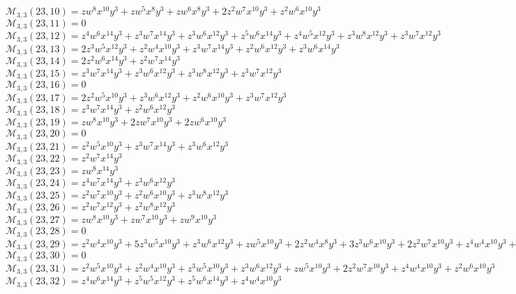 $\mathcal{M}_{3,3}(23,10)=zw^8x^{10}y^3+zw^5x^8y^3+zw^6x^8y^3+2z^2w^7x^{10}y^3+z^2w^6x^{10}y^3$\\
$\mathcal{M}_{3,3}(23,11)=0$\\
$\mathcal{M}_{3,3}(23,12)=z^4w^6x^{14}y^3+z^3w^7x^{14}y^3+z^3w^6x^{12}y^3+z^5w^6x^{14}y^3+z^4w^5x^{12}y^3+z^3w^8x^{12}y^3+z^3w^7x^{12}y^3$\\
$\mathcal{M}_{3,3}(23,13)=2z^3w^5x^{12}y^3+z^2w^4x^{10}y^3+z^3w^7x^{14}y^3+z^2w^6x^{12}y^3+z^3w^6x^{14}y^3$\\
$\mathcal{M}_{3,3}(23,14)=2z^2w^6x^{14}y^3+z^2w^7x^{14}y^3$\\
$\mathcal{M}_{3,3}(23,15)=z^3w^7x^{14}y^3+z^3w^6x^{12}y^3+z^3w^8x^{12}y^3+z^3w^7x^{12}y^3$\\
$\mathcal{M}_{3,3}(23,16)=0$\\
$\mathcal{M}_{3,3}(23,17)=2z^2w^5x^{10}y^3+z^3w^6x^{12}y^3+z^2w^6x^{10}y^3+z^3w^7x^{12}y^3$\\
$\mathcal{M}_{3,3}(23,18)=z^3w^7x^{14}y^3+z^2w^6x^{12}y^3$\\
$\mathcal{M}_{3,3}(23,19)=zw^8x^{10}y^3+2zw^7x^{10}y^3+2zw^6x^{10}y^3$\\
$\mathcal{M}_{3,3}(23,20)=0$\\
$\mathcal{M}_{3,3}(23,21)=z^2w^5x^{10}y^3+z^3w^7x^{14}y^3+z^3w^6x^{12}y^3$\\
$\mathcal{M}_{3,3}(23,22)=z^2w^7x^{14}y^3$\\
$\mathcal{M}_{3,3}(23,23)=zw^8x^{14}y^3$\\
$\mathcal{M}_{3,3}(23,24)=z^4w^7x^{14}y^3+z^3w^6x^{12}y^3$\\
$\mathcal{M}_{3,3}(23,25)=z^2w^7x^{10}y^3+z^2w^6x^{10}y^3+z^3w^8x^{12}y^3$\\
$\mathcal{M}_{3,3}(23,26)=z^2w^7x^{12}y^3+z^2w^8x^{12}y^3$\\
$\mathcal{M}_{3,3}(23,27)=zw^8x^{10}y^3+zw^7x^{10}y^3+zw^9x^{10}y^3$\\
$\mathcal{M}_{3,3}(23,28)=0$\\
$\mathcal{M}_{3,3}(23,29)=z^2w^4x^{10}y^3+5z^3w^5x^{10}y^3+z^3w^6x^{12}y^3+zw^5x^{10}y^3+2z^2w^4x^8y^3+3z^3w^6x^{10}y^3+2z^2w^7x^{10}y^3+z^4w^4x^{10}y^3+z^2w^5x^8y^3$\\
$\mathcal{M}_{3,3}(23,30)=0$\\
$\mathcal{M}_{3,3}(23,31)=z^2w^5x^{10}y^3+z^2w^4x^{10}y^3+z^3w^5x^{10}y^3+z^3w^6x^{12}y^3+zw^5x^{10}y^3+2z^2w^7x^{10}y^3+z^4w^4x^{10}y^3+z^2w^6x^{10}y^3$\\
$\mathcal{M}_{3,3}(23,32)=z^4w^6x^{14}y^3+z^5w^5x^{12}y^3+z^5w^6x^{14}y^3+z^4w^4x^{10}y^3$\\
